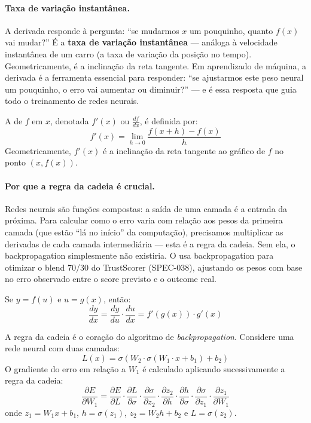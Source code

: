 \paragraph{Taxa de variação instantânea.} A derivada responde à pergunta:
``se mudarmos $x$ um pouquinho, quanto $f(x)$ vai mudar?'' É a
\textbf{taxa de variação instantânea} --- análoga à velocidade instantânea
de um carro (a taxa de variação da posição no tempo). Geometricamente, é a
inclinação da reta tangente. Em aprendizado de máquina, a derivada é a
ferramenta essencial para responder: ``se ajustarmos este peso neural um
pouquinho, o erro vai aumentar ou diminuir?'' --- e é essa resposta que guia
todo o treinamento de redes neurais.

\begin{definicao}[Derivada]
    A  de $f$ em $x$, denotada $f'(x)$ ou
    $\frac{df}{dx}$, é definida por:
    \[
    f'(x) = \lim_{h \to 0} \frac{f(x + h) - f(x)}{h}
    \]
    Geometricamente, $f'(x)$ é a inclinação da reta tangente ao gráfico de
    $f$ no ponto $(x, f(x))$.
\end{definicao}

\paragraph{Por que a regra da cadeia é crucial.} Redes neurais são funções
compostas: a saída de uma camada é a entrada da próxima. Para calcular como
o erro varia com relação aos pesos da primeira camada (que estão ``lá no
início'' da computação), precisamos multiplicar as derivadas de cada camada
intermediária --- esta é a regra da cadeia. Sem ela, o backpropagation
simplesmente não existiria. O \opencodeeco{} usa backpropagation para
otimizar o blend 70/30 do TrustScorer (SPEC-038), ajustando os pesos com
base no erro observado entre o score previsto e o outcome real.

\begin{teorema}
    Se $y = f(u)$ e $u = g(x)$, então:
    \[
    \frac{dy}{dx} = \frac{dy}{du} \cdot \frac{du}{dx} = f'(g(x)) \cdot g'(x)
    \]
\end{teorema}

\begin{exemplo}
    A regra da cadeia é o coração do algoritmo de \textit{backpropagation}.
    Considere uma rede neural com duas camadas:
    \[
    L(x) = \sigma(W_2 \cdot \sigma(W_1 \cdot x + b_1) + b_2)
    \]
    O gradiente do erro em relação a $W_1$ é calculado aplicando
    sucessivamente a regra da cadeia:
    \[
    \frac{\partial E}{\partial W_1} = \frac{\partial E}{\partial L} \cdot
    \frac{\partial L}{\partial \sigma} \cdot
    \frac{\partial \sigma}{\partial z_2} \cdot
    \frac{\partial z_2}{\partial h} \cdot
    \frac{\partial h}{\partial \sigma} \cdot
    \frac{\partial \sigma}{\partial z_1} \cdot
    \frac{\partial z_1}{\partial W_1}
    \]
    onde $z_1 = W_1 x + b_1$, $h = \sigma(z_1)$, $z_2 = W_2 h + b_2$ e
    $L = \sigma(z_2)$.
\end{exemplo}

